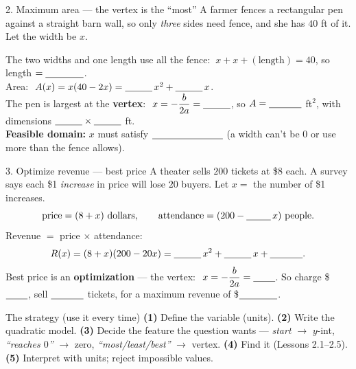 \documentclass[10pt]{article}
\begin{document}
\begin{notesbox}{2. Maximum area --- the vertex is the ``most''}
A farmer fences a rectangular pen against a straight barn wall, so only \emph{three} sides need fence, and she has
$40$ ft of it. Let the width be $x$.
\begin{center}
\end{center}
The two widths and one length use all the fence: $\ x+x+(\text{length})=40$, so length $=\blank{1.4cm}$. \\[3pt]
Area: $\ A(x)=x(40-2x)=\blank{1.0cm}\,x^2+\blank{1.0cm}\,x$. \\[3pt]
The pen is largest at the \textbf{vertex}: $\ x=-\dfrac{b}{2a}=\blank{1.0cm}$, so $A=\blank{1.2cm}$ ft$^2$, with
dimensions $\blank{1.0cm}\times\blank{1.0cm}$ ft. \\[3pt]
\textbf{Feasible domain:} $x$ must satisfy $\blank{2.6cm}$ (a width can't be $0$ or use more than the fence allows).
\end{notesbox}

\begin{notesbox}{3. Optimize revenue --- best price}
A theater sells $200$ tickets at \$8 each. A survey says each \$1 \emph{increase} in price will lose $20$ buyers.
Let $x=$ the number of \$1 increases.
\[
  \text{price}=(8+x)\text{ dollars},\qquad \text{attendance}=(200-\blank{0.9cm}\,x)\text{ people}.
\]
Revenue $=$ price $\times$ attendance:
\[
  R(x)=(8+x)(200-20x)=\blank{1.0cm}\,x^2+\blank{1.0cm}\,x+\blank{1.2cm}.
\]
Best price is an \textbf{optimization} --- the vertex: $\ x=-\dfrac{b}{2a}=\blank{0.8cm}$. So charge
\$$\blank{0.8cm}$, sell $\blank{1.2cm}$ tickets, for a maximum revenue of \$$\blank{1.4cm}$.
\end{notesbox}

\begin{notesbox}{The strategy (use it every time)}
\small
\textbf{(1)} Define the variable (units). \quad \textbf{(2)} Write the quadratic model. \quad \textbf{(3)} Decide the
feature the question wants --- \emph{start} $\to$ $y$-int, \emph{``reaches $0$''} $\to$ zero, \emph{``most/least/best''}
$\to$ vertex. \quad \textbf{(4)} Find it (Lessons 2.1--2.5). \quad \textbf{(5)} Interpret with units; reject
impossible values.
\end{notesbox}
\end{document}
